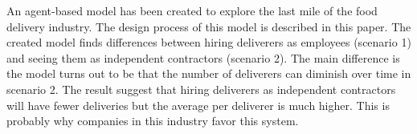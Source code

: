 An agent-based model has been created to explore the last mile of the food delivery industry.
The design process of this model is described in this paper.
The created model finds differences between hiring deliverers as employees (scenario 1) and seeing them as
independent contractors (scenario 2).
The main difference is the model turns out to be that the number of deliverers can diminish over time in scenario 2.
The result suggest that hiring deliverers as independent contractors will have fewer deliveries but the average per deliverer is much higher.
This is probably why companies in this industry favor this system. 